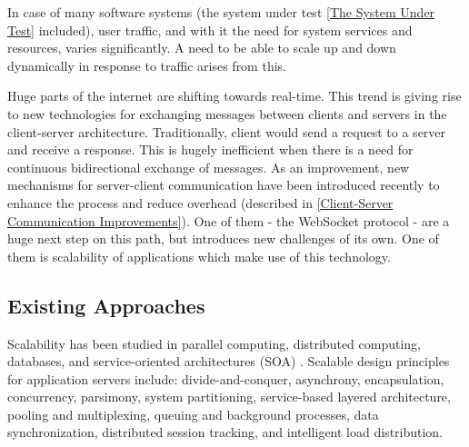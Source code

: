 \documentclass{uvamscse}
\begin{document}
In case of many software systems (the system under test \ref{The System Under Test} included), user traffic, and with it the need for system services and resources, varies significantly. A need to be able to scale up and down dynamically in response to traffic arises from this.

Huge parts of the internet are shifting towards real-time. This trend is giving rise to new technologies for exchanging messages between clients and servers in the client-server architecture. Traditionally, client would send a request to a server and receive a response. This is hugely inefficient when there is a need for continuous bidirectional exchange of messages. As an improvement, new mechanisms for server-client communication have been introduced recently to enhance the process and reduce overhead (described in \ref{Client-Server Communication Improvements}). One of them - the WebSocket protocol - are a huge next step on this path, but introduces new challenges of its own. One of them is scalability of applications which make use of this technology.

\subsection{Existing Approaches}
Scalability has been studied in parallel computing, distributed computing, databases, and service-oriented architectures (SOA) \cite{WeiTek}. Scalable design principles for application servers include: divide-and-conquer, asynchrony, encapsulation, concurrency, parsimony, system partitioning, service-based layered architecture, pooling and multiplexing, queuing and background processes, data synchronization, distributed session tracking, and intelligent load distribution.
\end{document}
